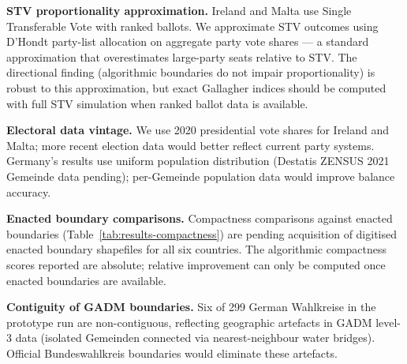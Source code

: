 \textbf{STV proportionality approximation.} Ireland and Malta use Single Transferable Vote with ranked ballots. We approximate STV outcomes using D'Hondt party-list allocation on aggregate party vote shares --- a standard approximation that overestimates large-party seats relative to STV. The directional finding (algorithmic boundaries do not impair proportionality) is robust to this approximation, but exact Gallagher indices should be computed with full STV simulation when ranked ballot data is available.

\textbf{Electoral data vintage.} We use 2020 presidential vote shares for Ireland and Malta; more recent election data would better reflect current party systems. Germany's results use uniform population distribution (Destatis ZENSUS 2021 Gemeinde data pending); per-Gemeinde population data would improve balance accuracy.

\textbf{Enacted boundary comparisons.} Compactness comparisons against enacted boundaries (Table~\ref{tab:results-compactness}) are pending acquisition of digitised enacted boundary shapefiles for all six countries. The algorithmic compactness scores reported are absolute; relative improvement can only be computed once enacted boundaries are available.

\textbf{Contiguity of GADM boundaries.} Six of 299 German Wahlkreise in the prototype run are non-contiguous, reflecting geographic artefacts in GADM level-3 data (isolated Gemeinden connected via nearest-neighbour water bridges). Official Bundeswahlkreis boundaries would eliminate these artefacts.

